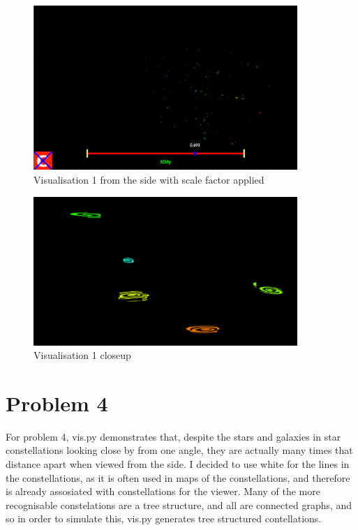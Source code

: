 \documentclass{article}
\begin{document}
\begin{figure}
	\centering
	\includegraphics[width=10cm]{2022-04-16-212318_1441x899_scrot.png}
	\caption{Visualisation 1 from the side with scale factor applied}
	\label{fig:v1:scale}
\end{figure}
\begin{figure}
	\centering
	\includegraphics[width=10cm]{2022-04-16-212857_900x507_scrot.png}
	\caption{Visualisation 1 closeup}
	\label{fig:v1:close}
\end{figure}


\section*{Problem 4}

For problem 4, vis.py demonstrates that, despite the stars and galaxies in star constellations looking close by from one angle, they are actually many times that distance apart when viewed from the side.
I decided to use white for the lines in the constellations,  as it is often used in maps of the constellations, and therefore is already assosiated with constellations for the viewer.
Many of the more recognisable constelations are a tree structure, and all are connected graphs, and so in order to simulate this, vis.py generates tree structured contellations.
\end{document}
